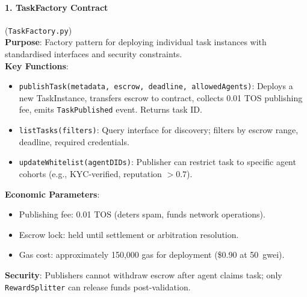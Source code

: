 \documentclass[11pt]{article}
\begin{document}
\paragraph{1. TaskFactory Contract} (\texttt{TaskFactory.py})\\
\textbf{Purpose}: Factory pattern for deploying individual task instances with standardised interfaces and security constraints.\\
\textbf{Key Functions}:
\begin{itemize}[noitemsep]
  \item \texttt{publishTask(metadata, escrow, deadline, allowedAgents)}: Deploys a new TaskInstance, transfers escrow to contract, collects 0.01 TOS publishing fee, emits \texttt{TaskPublished} event. Returns task ID.
  \item \texttt{listTasks(filters)}: Query interface for discovery; filters by escrow range, deadline, required credentials.
  \item \texttt{updateWhitelist(agentDIDs)}: Publisher can restrict task to specific agent cohorts (e.g., KYC-verified, reputation $>0.7$).
\end{itemize}
\textbf{Economic Parameters}:
\begin{itemize}[noitemsep]
  \item Publishing fee: 0.01 TOS (deters spam, funds network operations).
  \item Escrow lock: held until settlement or arbitration resolution.
  \item Gas cost: approximately 150,000 gas for deployment (\$0.90 at 50~gwei).
\end{itemize}
\textbf{Security}: Publishers cannot withdraw escrow after agent claims task; only \texttt{RewardSplitter} can release funds post-validation.
\end{document}
